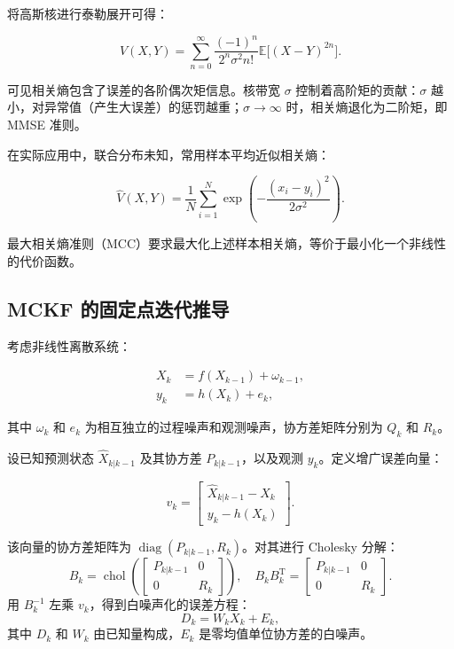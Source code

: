 将高斯核进行泰勒展开可得：

\begin{equation}
    V(X,Y)=\sum_{n=0}^{\infty}\frac{(-1)^n}{2^n\sigma^2 n!}\mathbb{E}\bigl[(X-Y)^{2n}\bigr].
\end{equation}

可见相关熵包含了误差的各阶偶次矩信息。核带宽 \(\sigma\) 控制着高阶矩的贡献：\(\sigma\) 越小，对异常值（产生大误差）的惩罚越重；\(\sigma\to\infty\) 时，相关熵退化为二阶矩，即 MMSE 准则。

在实际应用中，联合分布未知，常用样本平均近似相关熵：

\begin{equation}
    \hat V(X,Y)=\frac{1}{N}\sum_{i=1}^{N}\exp\left(-\frac{(x_i-y_i)^2}{2\sigma^2}\right).
\end{equation}

最大相关熵准则（MCC）要求最大化上述样本相关熵，等价于最小化一个非线性的代价函数。

\subsection{MCKF 的固定点迭代推导}

考虑非线性离散系统：

\begin{equation}
    \begin{aligned}
        X_k & = f(X_{k-1}) + \omega_{k-1}, \\
        y_k & = h(X_k) + e_k,
    \end{aligned}
\end{equation}

其中 \(\omega_k\) 和 \(e_k\) 为相互独立的过程噪声和观测噪声，协方差矩阵分别为 \(Q_k\) 和 \(R_k\)。

设已知预测状态 \(\hat{X}_{k|k-1}\) 及其协方差 \(P_{k|k-1}\)，以及观测 \(y_k\)。定义增广误差向量：

\begin{equation}
    v_k = \begin{bmatrix} \hat{X}_{k|k-1} - X_k \\ y_k - h(X_k) \end{bmatrix}.
\end{equation}

该向量的协方差矩阵为 \(\operatorname{diag}(P_{k|k-1}, R_k)\)。对其进行 Cholesky 分解：
\begin{equation}
    B_k = \operatorname{chol}\left(\begin{bmatrix} P_{k|k-1} & 0 \\ 0 & R_k \end{bmatrix}\right),\quad B_k B_k^{\mathrm{T}} = \begin{bmatrix} P_{k|k-1} & 0 \\ 0 & R_k \end{bmatrix}.
\end{equation}
用 \(B_k^{-1}\) 左乘 \(v_k\)，得到白噪声化的误差方程：
\[
    D_k = W_k X_k + E_k,
\]
其中 \(D_k\) 和 \(W_k\) 由已知量构成，\(E_k\) 是零均值单位协方差的白噪声。

